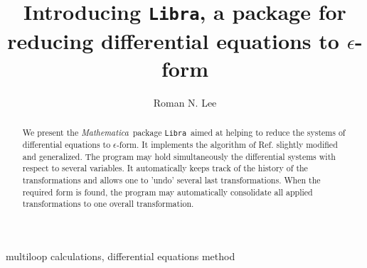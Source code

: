 \documentclass[sort&compress]{elsarticle}
\newcommand{\Libra}{\texttt{Libra}}
\newcommand{\Mathematica}{\textit{Mathematica}}
\begin{document}
\begin{frontmatter}

\title{Introducing \Libra, a package for reducing differential equations to $\epsilon$-form}

\author{Roman N. Lee}

\address{Budker Institute of Nuclear Physics, 630090, Novosibirsk, Russia}

\begin{abstract}
We present the \Mathematica\ package \Libra\ aimed at helping to reduce the systems of differential equations to $\epsilon$-form. It implements the algorithm of Ref. \cite{Lee:2014} slightly modified and generalized. The program may hold simultaneously the differential systems with respect to several variables. It automatically keeps track of the history of the transformations and allows one to 'undo' several last transformations. When the required form is found, the program may automatically consolidate all applied transformations to one overall transformation.
\end{abstract}

\begin{keyword}
multiloop calculations, differential equations method
\end{keyword}

\end{frontmatter}
\end{document}
